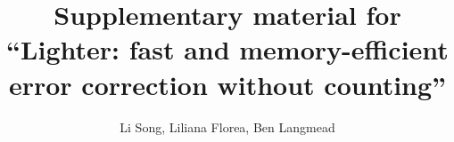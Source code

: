\documentclass[10pt]{article}
\begin{document}
\newcommand{\forexample}{e.g.\@\xspace}
\newcommand{\thatis}{i.e.\@\xspace}
\newcommand{\andothers}{et al.\@\xspace}
\newcommand{\kmer}{\ensuremath{k}-mer\xspace}
\newcommand{\kmers}{\ensuremath{k}-mers\xspace}
\newcommand{\tool}{Lighter\xspace}
\newcommand{\ecoli}{\emph{E. coli}\xspace}

\newcommand\myworries[1]{\textcolor{red}{#1}}%


\title{Supplementary material for ``Lighter: fast and memory-efficient error correction without counting''}


\author{Li Song, Liliana Florea, Ben Langmead}

\renewcommand\Authands{ and }




\maketitle


\end{document}
